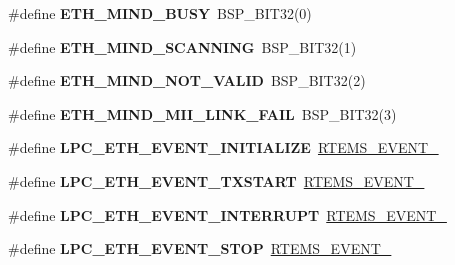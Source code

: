 \begin{DoxyCompactItemize}
\item 
\mbox{\label{lpc-ethernet_8c_a6d0b89c54d84e1ffeab0521f0ab8d46d}} 
\#define {\bfseries E\+T\+H\+\_\+\+M\+I\+N\+D\+\_\+\+B\+U\+SY}~B\+S\+P\+\_\+\+B\+I\+T32(0)
\item 
\mbox{\label{lpc-ethernet_8c_a6071da130a786aec780aa6419795d7f9}} 
\#define {\bfseries E\+T\+H\+\_\+\+M\+I\+N\+D\+\_\+\+S\+C\+A\+N\+N\+I\+NG}~B\+S\+P\+\_\+\+B\+I\+T32(1)
\item 
\mbox{\label{lpc-ethernet_8c_a295638da991a9a5855bde5d289d83918}} 
\#define {\bfseries E\+T\+H\+\_\+\+M\+I\+N\+D\+\_\+\+N\+O\+T\+\_\+\+V\+A\+L\+ID}~B\+S\+P\+\_\+\+B\+I\+T32(2)
\item 
\mbox{\label{lpc-ethernet_8c_aefd5061662ec8304800010f3f80a9963}} 
\#define {\bfseries E\+T\+H\+\_\+\+M\+I\+N\+D\+\_\+\+M\+I\+I\+\_\+\+L\+I\+N\+K\+\_\+\+F\+A\+IL}~B\+S\+P\+\_\+\+B\+I\+T32(3)
\item 
\mbox{\label{lpc-ethernet_8c_a11a4b564ac50b581bf0f0cbea90da4d1}} 
\#define {\bfseries L\+P\+C\+\_\+\+E\+T\+H\+\_\+\+E\+V\+E\+N\+T\+\_\+\+I\+N\+I\+T\+I\+A\+L\+I\+ZE}~\mbox{\hyperlink{group__ClassicEventSet_ga9f027021d0070d4f9e35cccb41029e2d}{R\+T\+E\+M\+S\+\_\+\+E\+V\+E\+N\+T\+\_}}
\item 
\mbox{\label{lpc-ethernet_8c_ab112fa84a3f212d504cd23fdf04f867b}} 
\#define {\bfseries L\+P\+C\+\_\+\+E\+T\+H\+\_\+\+E\+V\+E\+N\+T\+\_\+\+T\+X\+S\+T\+A\+RT}~\mbox{\hyperlink{group__ClassicEventSet_gabe43c4a86241e31321b3cfe70045dca6}{R\+T\+E\+M\+S\+\_\+\+E\+V\+E\+N\+T\+\_}}
\item 
\mbox{\label{lpc-ethernet_8c_ac4d8baf108d3ae9b03746baf17856cc8}} 
\#define {\bfseries L\+P\+C\+\_\+\+E\+T\+H\+\_\+\+E\+V\+E\+N\+T\+\_\+\+I\+N\+T\+E\+R\+R\+U\+PT}~\mbox{\hyperlink{group__ClassicEventSet_ga59fb1c14abb8996e91c0cbf3276be503}{R\+T\+E\+M\+S\+\_\+\+E\+V\+E\+N\+T\+\_}}
\item 
\mbox{\label{lpc-ethernet_8c_a111cd15228bb586cef0f728c095ed728}} 
\#define {\bfseries L\+P\+C\+\_\+\+E\+T\+H\+\_\+\+E\+V\+E\+N\+T\+\_\+\+S\+T\+OP}~\mbox{\hyperlink{group__ClassicEventSet_gaa8fcddcabf4b0acda9a5d80c43968b51}{R\+T\+E\+M\+S\+\_\+\+E\+V\+E\+N\+T\+\_}}

\end{DoxyCompactItemize}
